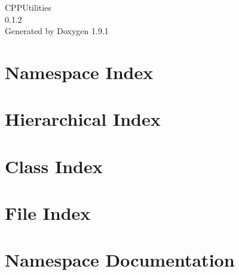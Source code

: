 \let\mypdfximage\pdfximage\def\pdfximage{\immediate\mypdfximage}\documentclass[twoside]{book}
\newcommand{\+}{\discretionary{\mbox{\scriptsize$\hookleftarrow$}}{}{}}
\newcommand{\clearemptydoublepage}{%
  \newpage{\pagestyle{empty}\cleardoublepage}%
}
\begin{document}
\raggedbottom

\hypersetup{pageanchor=false,
             bookmarksnumbered=true,
             pdfencoding=unicode
            }
\begin{titlepage}
\vspace*{7cm}
\begin{center}%
{\Large CPPUtilities \\[1ex]\large 0.\+1.\+2 }\\
\vspace*{1cm}
{\large Generated by Doxygen 1.9.1}\\
\end{center}
\end{titlepage}
\clearemptydoublepage
{}
\tableofcontents
\clearemptydoublepage
{}
\hypersetup{pageanchor=true}

\chapter{Namespace Index}

\chapter{Hierarchical Index}

\chapter{Class Index}

\chapter{File Index}

\chapter{Namespace Documentation}






















\end{document}
